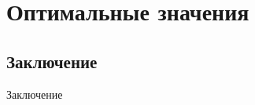 \section{Оптимальные значения}

\subsection{Заключение}
\begin{flushleft}
	Заключение
\end{flushleft}